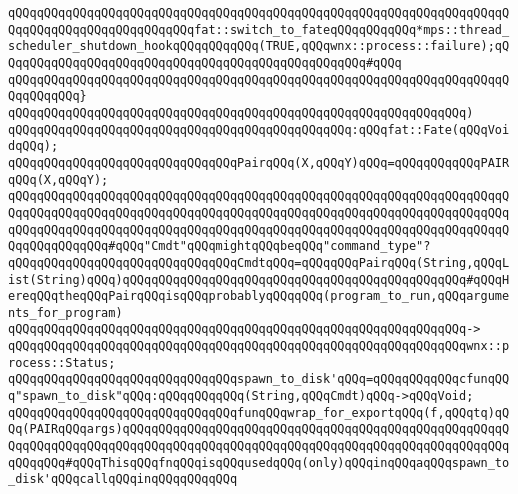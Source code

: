 \verb|qQQqqQQqqQQqqQQqqQQqqQQqqQQqqQQqqQQqqQQqqQQqqQQqqQQqqQQqqQQqqQQqqQQqqQQqqQQqqQQqqQQqqQQqqQQqqQQqfat::switch_to_fateqQQqqQQqqQQq*mps::thread_scheduler_shutdown_hookqQQqqQQqqQQq(TRUE,qQQqwnx::process::failure);qQQqqQQqqQQqqQQqqQQqqQQqqQQqqQQqqQQqqQQqqQQqqQQqqQQq#qQQq|\newline
\newline
\verb|qQQqqQQqqQQqqQQqqQQqqQQqqQQqqQQqqQQqqQQqqQQqqQQqqQQqqQQqqQQqqQQqqQQqqQQqqQQqqQQq}|\newline
\verb|qQQqqQQqqQQqqQQqqQQqqQQqqQQqqQQqqQQqqQQqqQQqqQQqqQQqqQQqqQQqqQQq)|\newline
\verb|qQQqqQQqqQQqqQQqqQQqqQQqqQQqqQQqqQQqqQQqqQQqqQQq:qQQqfat::Fate(qQQqVoidqQQq);|\newline
\newline
\newline
\verb|qQQqqQQqqQQqqQQqqQQqqQQqqQQqqQQqPairqQQq(X,qQQqY)qQQq=qQQqqQQqqQQqPAIRqQQq(X,qQQqY);|\newline
\newline
\verb|qQQqqQQqqQQqqQQqqQQqqQQqqQQqqQQqqQQqqQQqqQQqqQQqqQQqqQQqqQQqqQQqqQQqqQQqqQQqqQQqqQQqqQQqqQQqqQQqqQQqqQQqqQQqqQQqqQQqqQQqqQQqqQQqqQQqqQQqqQQqqQQqqQQqqQQqqQQqqQQqqQQqqQQqqQQqqQQqqQQqqQQqqQQqqQQqqQQqqQQqqQQqqQQqqQQqqQQqqQQqqQQq#qQQq"Cmdt"qQQqmightqQQqbeqQQq"command_type"?|\newline
\verb|qQQqqQQqqQQqqQQqqQQqqQQqqQQqqQQqCmdtqQQq=qQQqqQQqPairqQQq(String,qQQqList(String)qQQq)qQQqqQQqqQQqqQQqqQQqqQQqqQQqqQQqqQQqqQQqqQQqqQQq#qQQqHereqQQqtheqQQqPairqQQqisqQQqprobablyqQQqqQQq(program_to_run,qQQqarguments_for_program)|\newline
\verb|qQQqqQQqqQQqqQQqqQQqqQQqqQQqqQQqqQQqqQQqqQQqqQQqqQQqqQQqqQQqqQQq->|\newline
\verb|qQQqqQQqqQQqqQQqqQQqqQQqqQQqqQQqqQQqqQQqqQQqqQQqqQQqqQQqqQQqqQQqwnx::process::Status;|\newline
\newline
\newline
\verb|qQQqqQQqqQQqqQQqqQQqqQQqqQQqqQQqspawn_to_disk'qQQq=qQQqqQQqqQQqcfunqQQq"spawn_to_disk"qQQq:qQQqqQQqqQQq(String,qQQqCmdt)qQQq->qQQqVoid;|\newline
\newline
\newline
\verb|qQQqqQQqqQQqqQQqqQQqqQQqqQQqqQQqfunqQQqwrap_for_exportqQQq(f,qQQqtq)qQQq(PAIRqQQqargs)qQQqqQQqqQQqqQQqqQQqqQQqqQQqqQQqqQQqqQQqqQQqqQQqqQQqqQQqqQQqqQQqqQQqqQQqqQQqqQQqqQQqqQQqqQQqqQQqqQQqqQQqqQQqqQQqqQQqqQQqqQQqqQQqqQQq#qQQqThisqQQqfnqQQqisqQQqusedqQQq(only)qQQqinqQQqaqQQqspawn_to_disk'qQQqcallqQQqinqQQqqQQqqQQq|\newline
